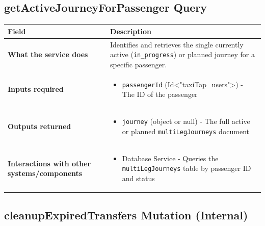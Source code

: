 \documentclass[11pt,a4paper]{article}
\begin{document}
\subsection{getActiveJourneyForPassenger Query}

\begin{longtable}{|p{4cm}|p{12cm}|}
\hline
\textbf{Field} & \textbf{Description} \\
\hline
\textbf{What the service does} & 
Identifies and retrieves the single currently active (\texttt{in\_progress}) or planned journey for a specific passenger. \\
\hline
\textbf{Inputs required} & 
\begin{itemize}[nosep]
\item \texttt{passengerId} (Id<"taxiTap\_users">) - The ID of the passenger
\end{itemize} \\
\hline
\textbf{Outputs returned} & 
\begin{itemize}[nosep]
\item \texttt{journey} (object or null) - The full active or planned \texttt{multiLegJourneys} document
\end{itemize} \\
\hline
\textbf{Interactions with other systems/components} & 
\begin{itemize}[nosep]
\item Database Service - Queries the \texttt{multiLegJourneys} table by passenger ID and status
\end{itemize} \\
\hline
\end{longtable}

\subsection{cleanupExpiredTransfers Mutation (Internal)}
\end{document}
